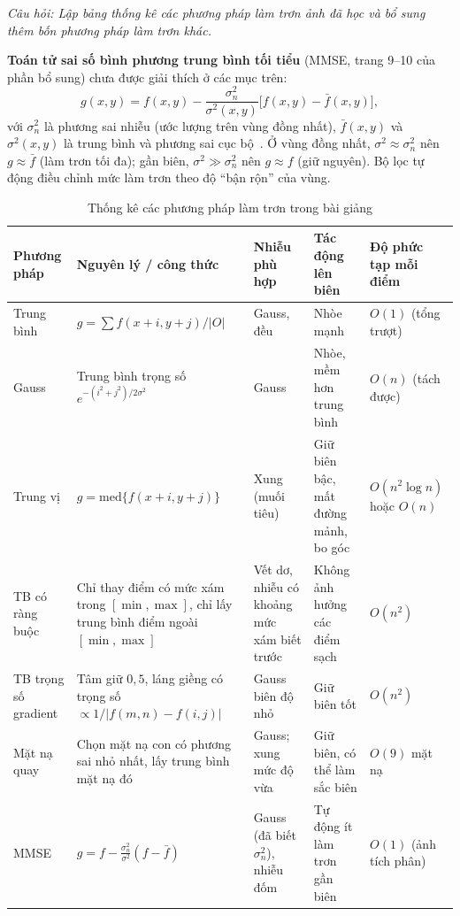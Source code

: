 \textit{Câu hỏi: Lập bảng thống kê các phương pháp làm trơn ảnh đã học và bổ sung thêm bốn phương pháp làm trơn khác.}


\textbf{Toán tử sai số bình phương trung bình tối tiểu} (MMSE, trang 9--10 của phần bổ sung) chưa được giải thích ở các mục trên:
\begin{equation}
g(x, y) = f(x, y) - \frac{\sigma_n^2}{\sigma^2(x, y)}\big[f(x, y) - \bar{f}(x, y)\big],
\end{equation}
với $\sigma_n^2$ là phương sai nhiễu (ước lượng trên vùng đồng nhất), $\bar f(x, y)$ và $\sigma^2(x, y)$ là trung bình và phương sai cục bộ~\citep{lee1980digital}. Ở vùng đồng nhất, $\sigma^2 \approx \sigma_n^2$ nên $g \approx \bar f$ (làm trơn tối đa); gần biên, $\sigma^2 \gg \sigma_n^2$ nên $g \approx f$ (giữ nguyên). Bộ lọc tự động điều chỉnh mức làm trơn theo độ ``bận rộn'' của vùng.

\begin{table}[!htbp]
\centering
\scriptsize
\caption{Thống kê các phương pháp làm trơn trong bài giảng}
\label{tab:w6_smooth_lecture}
\renewcommand{\arraystretch}{1.3}
\begin{tabularx}{\textwidth}{|p{1.7cm}|X|p{2.1cm}|X|p{1.6cm}|}
\hline
\textbf{Phương pháp} & \textbf{Nguyên lý / công thức} & \textbf{Nhiễu phù hợp} & \textbf{Tác động lên biên} & \textbf{Độ phức tạp mỗi điểm} \\
\hline
Trung bình & $g = \sum f(x + i, y + j)/|O|$ & Gauss, đều & Nhòe mạnh & $O(1)$ (tổng trượt) \\
\hline
Gauss & Trung bình trọng số $e^{-(i^2 + j^2)/2\sigma^2}$ & Gauss & Nhòe, mềm hơn trung bình & $O(n)$ (tách được) \\
\hline
Trung vị & $g = \mathrm{med}\{f(x + i, y + j)\}$ & Xung (muối tiêu) & Giữ biên bậc, mất đường mảnh, bo góc & $O(n^2 \log n)$ hoặc $O(n)$ \\
\hline
TB có ràng buộc & Chỉ thay điểm có mức xám trong $[\min, \max]$, chỉ lấy trung bình điểm ngoài $[\min, \max]$ & Vết dơ, nhiễu có khoảng mức xám biết trước & Không ảnh hưởng các điểm sạch & $O(n^2)$ \\
\hline
TB trọng số gradient & Tâm giữ $0{,}5$, láng giềng có trọng số $\propto 1/|f(m, n) - f(i, j)|$ & Gauss biên độ nhỏ & Giữ biên tốt & $O(n^2)$ \\
\hline
Mặt nạ quay & Chọn mặt nạ con có phương sai nhỏ nhất, lấy trung bình mặt nạ đó & Gauss; xung mức độ vừa & Giữ biên, có thể làm sắc biên & $O(9)$ mặt nạ \\
\hline
MMSE & $g = f - \frac{\sigma_n^2}{\sigma^2}(f - \bar f)$ & Gauss (đã biết $\sigma_n^2$), nhiễu đốm & Tự động ít làm trơn gần biên & $O(1)$ (ảnh tích phân) \\
\hline
\end{tabularx}
\end{table}

